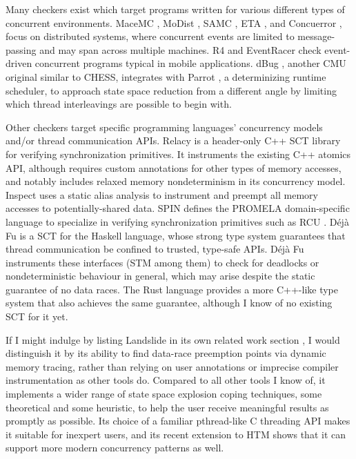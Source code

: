 Many checkers exist which target programs written for various different types of concurrent environments.
MaceMC \cite{macemc}, MoDist \cite{modist}, SAMC \cite{samc}, ETA \cite{dbug-retreat}, and Concuerror \cite{concuerror},
focus on distributed systems, where concurrent events are limited to message-passing and may span across multiple machines.
R4 \cite{r4} and EventRacer \cite{eventracer} check event-driven concurrent programs typical in mobile applications.
dBug \cite{dbug-ssv}, another CMU original similar to CHESS,
integrates with Parrot \cite{parrot}, a determinizing runtime scheduler,
to approach state space reduction from a different angle by limiting which thread interleavings are possible to begin with.

Other checkers target specific programming languages' concurrency models and/or thread communication APIs.
Relacy \cite{relacy} is a header-only C++ SCT library for verifying synchronization primitives.
It instruments the existing C++ atomics API,
although requires custom annotations for other types of memory accesses,
and notably includes relaxed memory nondeterminism in its concurrency model.
Inspect \cite{inspect} uses a static alias analysis to instrument and preempt all memory accesses to potentially-shared data.
SPIN \cite{spin} defines the PROMELA domain-specific language
to specialize in verifying synchronization primitives such as RCU \cite{rcu}.
%
D\'{e}j\`{a} Fu \cite{dejafu} is a SCT
for the Haskell language,
whose strong type system guarantees that thread communication be confined to trusted, type-safe APIs.
D\'{e}j\`{a} Fu instruments these interfaces (STM among them)
to check for deadlocks or nondeterministic behaviour in general,
which may arise despite the static guarantee of no data races.
The Rust language \cite{rust-language}
provides a more C++-like type system that also
achieves the same guarantee, although I know of no existing SCT for it yet.

If I might indulge by listing Landslide in its own related work section \cite{this-thesis},
I would distinguish it by its ability to find data-race preemption points via dynamic memory tracing,
rather than relying on user annotations or imprecise compiler instrumentation
as other tools do.
Compared to all other tools I know of,
it implements a wider range of state space explosion coping techniques,
some theoretical and some heuristic,
to help the user receive meaningful results as promptly as possible.
Its choice of a familiar pthread-like C threading API makes it suitable for inexpert users,
and its recent extension to HTM shows that it can support more modern concurrency patterns as well.


